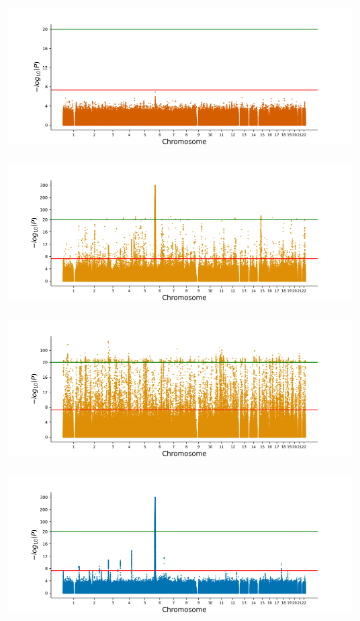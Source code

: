 \begin{figure}[h!]
\begin{subfigure}{.5\textwidth}
    \includegraphics[width=\textwidth]{figures/manhattan_bin/regenie_400kVitiligo.png}
    \end{subfigure}
    \begin{subfigure}{.5\textwidth}
    \includegraphics[width=\textwidth]{figures/manhattan_bin/imputed_bgen_bolt_2.sumstats.gz.png}
    \end{subfigure}%
    \begin{subfigure}{.5\textwidth}
    \includegraphics[width=\textwidth]{figures/manhattan_bin/imputed_bgen_bolt_3.sumstats.gz.png}
    \end{subfigure}
    \begin{subfigure}{.5\textwidth}
    \includegraphics[width=\textwidth]{figures/manhattan_bin/qd_Coeliac_disease.sumstats.gz.png}

\end{subfigure}
\end{figure}
